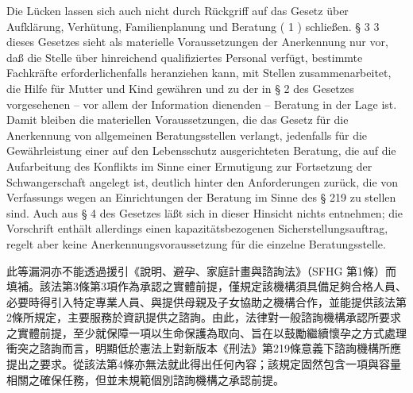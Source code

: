 \documentclass[12pt]{article}
\begin{document}
\begin{sourcepara}[title={原文E.171}]
Die Lücken lassen sich auch nicht durch Rückgriff auf das Gesetz über Aufklärung, Verhütung, Familienplanung und Beratung (\abbrArt{} 1 \abbrSFHG{}) schließen. § 3 \abbrAbs{} 3 dieses Gesetzes sieht als materielle Voraussetzungen der Anerkennung nur vor, daß die Stelle über hinreichend qualifiziertes Personal verfügt, bestimmte Fachkräfte erforderlichenfalls heranziehen kann, mit Stellen zusammenarbeitet, die Hilfe für Mutter und Kind gewähren und zu der in § 2 des Gesetzes vorgesehenen -- vor allem der Information dienenden -- Beratung in der Lage ist. Damit bleiben die materiellen Voraussetzungen, die das Gesetz für die Anerkennung von allgemeinen Beratungsstellen verlangt, jedenfalls für die Gewährleistung einer auf den Lebensschutz ausgerichteten Beratung, die auf die Aufarbeitung des Konflikts im Sinne einer Ermutigung zur Fortsetzung der Schwangerschaft angelegt ist, deutlich hinter den Anforderungen zurück, die von Verfassungs wegen an Einrichtungen der Beratung im Sinne des § 219 \abbrStGB{} \abbrNF{} zu stellen sind. Auch aus § 4 des Gesetzes läßt sich in dieser Hinsicht nichts entnehmen; die Vorschrift enthält allerdings einen kapazitätsbezogenen Sicherstellungsauftrag, regelt aber keine Anerkennungsvoraussetzung für die einzelne Beratungsstelle.
\end{sourcepara}
\begin{transpara}
此等漏洞亦不能透過援引《說明、避孕、家庭計畫與諮詢法》（SFHG 第1條）而填補。該法第3條第3項作為承認之實體前提，僅規定該機構須具備足夠合格人員、必要時得引入特定專業人員、與提供母親及子女協助之機構合作，並能提供該法第2條所規定，主要服務於資訊提供之諮詢。由此，法律對一般諮詢機構承認所要求之實體前提，至少就保障一項以生命保護為取向、旨在以鼓勵繼續懷孕之方式處理衝突之諮詢而言，明顯低於憲法上對新版本《刑法》第219條意義下諮詢機構所應提出之要求。從該法第4條亦無法就此得出任何內容；該規定固然包含一項與容量相關之確保任務，但並未規範個別諮詢機構之承認前提。
\end{transpara}
\end{document}
